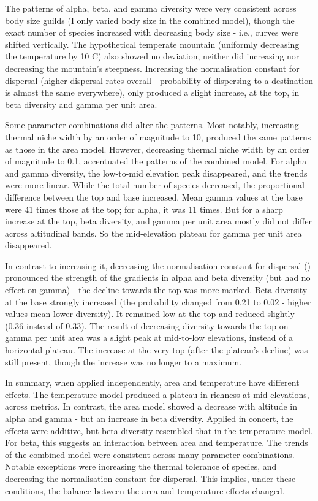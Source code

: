 \documentclass[11pt]{article}
\begin{document}
The patterns of alpha, beta, and gamma diversity were very consistent across body size guilds (I only varied body size in the combined model), though the exact number of species increased with decreasing body size - i.e., curves were shifted vertically. The hypothetical temperate mountain (uniformly decreasing the temperature by 10 \degree C) also showed no deviation, neither did increasing nor decreasing the mountain’s steepness. Increasing the normalisation constant for dispersal (higher dispersal rates overall - probability of dispersing to a destination is almost the same everywhere), only produced a slight increase, at the top, in beta diversity and gamma per unit area.

Some parameter combinations did alter the patterns. Most notably, increasing thermal niche width by an order of magnitude to 10, produced the same patterns as those in the area model. However, decreasing thermal niche width by an order of magnitude to 0.1, accentuated the patterns of the combined model. For alpha and gamma diversity, the low-to-mid elevation peak disappeared, and the trends were more linear. While the total number of species decreased, the proportional difference between the top and base increased. Mean gamma values at the base were 41 times those at the top; for alpha, it was 11 times. But for a sharp increase at the top, beta diversity, and gamma per unit area mostly did not differ across altitudinal bands. So the mid-elevation plateau for gamma per unit area disappeared.

In contrast to increasing it, decreasing the normalisation constant for dispersal () pronounced the strength of the gradients in alpha and beta diversity (but had no effect on gamma) - the decline towards the top was more marked. Beta diversity at the base strongly increased (the probability changed from 0.21 to 0.02 - higher values mean lower diversity). It remained low at the top and reduced slightly (0.36 instead of 0.33). The result of decreasing diversity towards the top on gamma per unit area was a slight peak at mid-to-low elevations, instead of a horizontal plateau. The increase at the very top (after the plateau’s decline) was still present, though the increase was no longer to a maximum.

In summary, when applied independently, area and temperature have different effects. The temperature model produced a plateau in richness at mid-elevations, across metrics. In contrast, the area model showed a decrease with altitude in alpha and gamma - but an increase in beta diversity. Applied in concert, the effects were additive, but beta diversity resembled that in the temperature model. For beta, this suggests an interaction between area and temperature. The trends of the combined model were consistent across many parameter combinations. Notable exceptions were increasing the thermal tolerance of species, and decreasing the normalisation constant for dispersal. This implies, under these conditions, the balance between the area and temperature effects changed.
\end{document}
